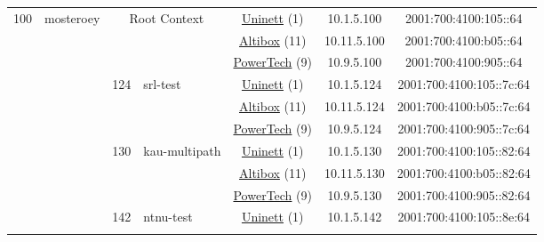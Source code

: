\begin{small}
\begin{center}
\begin{longtable}{|c|c|c|c|c|c|c|c|}
 \multirow{30}{*}{\tiny{100}} & \multicolumn{1}{|l|}{\multirow{30}{*}{\tiny{mosteroey}}} & \multicolumn{2}{|c|}{\multirow{3}{*}{\tiny{Root Context}}} & \multicolumn{2}{|c|}{\tiny{\href{https://www.uninett.no}{Uninett} (1)}} & \tiny{10.1.5.100} & \tiny{2001:700:4100:105::64} \\* \cline{5-5}\cline{6-6}\cline{7-7}\cline{8-8}
  &  & \multicolumn{2}{|c|}{} & \multicolumn{2}{|c|}{\tiny{\href{https://www.altibox.no}{Altibox} (11)}} & \tiny{10.11.5.100} & \tiny{2001:700:4100:b05::64} \\* \cline{5-5}\cline{6-6}\cline{7-7}\cline{8-8}
  &  & \multicolumn{2}{|c|}{} & \multicolumn{2}{|c|}{\tiny{\href{http://www.powertech.no}{PowerTech} (9)}} & \tiny{10.9.5.100} & \tiny{2001:700:4100:905::64} \\* \cline{3-3}\cline{4-4}\cline{5-5}\cline{6-6}\cline{7-7}\cline{8-8}
  &  & \multirow{3}{*}{\tiny{124}} & \multicolumn{1}{|l|}{\multirow{3}{*}{\tiny{srl-test}}} & \multicolumn{2}{|c|}{\tiny{\href{https://www.uninett.no}{Uninett} (1)}} & \tiny{10.1.5.124} & \tiny{2001:700:4100:105::7c:64} \\* \cline{5-5}\cline{6-6}\cline{7-7}\cline{8-8}
  &  &  &  & \multicolumn{2}{|c|}{\tiny{\href{https://www.altibox.no}{Altibox} (11)}} & \tiny{10.11.5.124} & \tiny{2001:700:4100:b05::7c:64} \\* \cline{5-5}\cline{6-6}\cline{7-7}\cline{8-8}
  &  &  &  & \multicolumn{2}{|c|}{\tiny{\href{http://www.powertech.no}{PowerTech} (9)}} & \tiny{10.9.5.124} & \tiny{2001:700:4100:905::7c:64} \\* \cline{3-3}\cline{4-4}\cline{5-5}\cline{6-6}\cline{7-7}\cline{8-8}
  &  & \multirow{3}{*}{\tiny{130}} & \multicolumn{1}{|l|}{\multirow{3}{*}{\tiny{kau-multipath}}} & \multicolumn{2}{|c|}{\tiny{\href{https://www.uninett.no}{Uninett} (1)}} & \tiny{10.1.5.130} & \tiny{2001:700:4100:105::82:64} \\* \cline{5-5}\cline{6-6}\cline{7-7}\cline{8-8}
  &  &  &  & \multicolumn{2}{|c|}{\tiny{\href{https://www.altibox.no}{Altibox} (11)}} & \tiny{10.11.5.130} & \tiny{2001:700:4100:b05::82:64} \\* \cline{5-5}\cline{6-6}\cline{7-7}\cline{8-8}
  &  &  &  & \multicolumn{2}{|c|}{\tiny{\href{http://www.powertech.no}{PowerTech} (9)}} & \tiny{10.9.5.130} & \tiny{2001:700:4100:905::82:64} \\* \cline{3-3}\cline{4-4}\cline{5-5}\cline{6-6}\cline{7-7}\cline{8-8}
  &  & \multirow{3}{*}{\tiny{142}} & \multicolumn{1}{|l|}{\multirow{3}{*}{\tiny{ntnu-test}}} & \multicolumn{2}{|c|}{\tiny{\href{https://www.uninett.no}{Uninett} (1)}} & \tiny{10.1.5.142} & \tiny{2001:700:4100:105::8e:64} \\* \cline{5-5}\cline{6-6}\cline{7-7}\cline{8-8}

\end{longtable}
\end{center}
\end{small}
